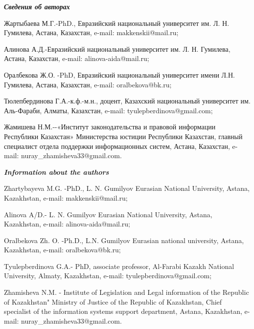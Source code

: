 \emph{{\bfseries Сведения об авторах}}

Жартыбаева М.Г.-PhD., Евразийский национальный университет им. Л. Н.
Гумилева, Астана, Казахстан, e-mail: makkenskii@mail.ru;

Алинова А.Д.-Евразийский национальный университет им. Л. Н. Гумилева,
Астана, Казахстан, e-mail: alinova-aida@mail.ru;

Оралбекова Ж.О. -PhD, Евразийский национальный университет имени Л.Н.
Гумилева, Астана, Казахстан, e-mail: oralbekova@bk.ru;

Тюлепбердинова Г.А.-к.ф.-м.н., доцент, Казахский национальный
университет им. Аль-Фараби, Алматы, Казахстан, e-mail:
tyulepberdinova@gmail.com;

Жамишева Н.М.-\/-«Институт законодательства и правовой информации
Республики Казахстан» Министерства юстиции Республики Казахстан, главный
специалист отдела поддержки информационных систем, Астана, Казахстан,
e-mail: nuray\_zhamisheva33@gmail.com.

\emph{{\bfseries Information about the authors}}

Zhartybayeva M.G. -PhD., L. N. Gumilyov Eurasian National University,
Astana, Kazakhstan, e-mail: makkenskii@mail.ru;

Alinova A/D.- L. N. Gumilyov Eurasian National University, Astana,
Kazakhstan, e-mail: alinova-aida@mail.ru;

Oralbekova Zh. O. -Ph.D., L.N. Gumilyov Eurasian national university,
Astana, Kazakhstan, e-mail: oralbekova@bk.ru;

Tyulepberdinova G.A.- PhD, associate professor, Al-Farabi Kazakh
National University, Almaty, Kazakhstan, e-mail:
tyulepberdinova@gmail.com;

Zhamisheva N.M. - Institute of Legislation and Legal information of the
Republic of Kazakhstan" Ministry of Justice of the Republic of
Kazakhstan, Chief specialist of the information systems support
department, Astana, Kazakhstan, e-mail: nuray\_zhamisheva33@gmail.com.




